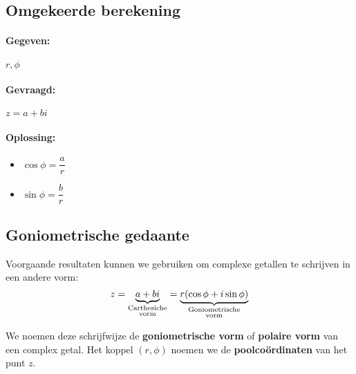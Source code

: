 \documentclass[12pt,twoside]{article}
\begin{document}
\pagebreak
\subsection{Omgekeerde berekening}

\paragraph*{Gegeven: } $r, \phi$

\paragraph*{Gevraagd: } $z=a+bi$

\paragraph*{Oplossing: }
\begin{itemize}
  \item $\cos \phi = \dfrac{a}{r}$ \; 
  \item $\sin \phi = \dfrac{b}{r}$ \; 
\end{itemize}

\subsection{Goniometrische gedaante}

Voorgaande resultaten kunnen we gebruiken om complexe getallen te schrijven in een andere vorm:
$$z = \underbrace{a+bi}_{\text{\shortstack{Carthesiche\\vorm}}} = \underbrace{r(\cos\phi + i\sin\phi)}_{\text{\shortstack{Goniometrische\\vorm}}}$$

We noemen deze schrijfwijze de {\bf goniometrische vorm} of {\bf polaire vorm} van een complex getal. Het koppel $(r,\phi)$ noemen we de {\bf poolcoördinaten} van het punt $z$.
\end{document}
